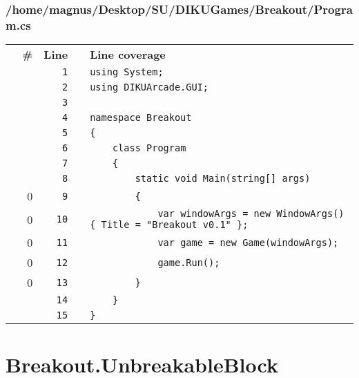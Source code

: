 \documentclass[a4paper,landscape,10pt]{article}
\begin{document}
\subsubsection{/home/magnus/Desktop/SU/DIKUGames/Breakout/Program.cs}
\begin{longtable}[l]{lrrll}
\textbf{} & \textbf{\#} & \textbf{Line} & \textbf{} & \textbf{Line coverage}\\
\cellcolor{gray} &  & \verb~1~ & & \verb~using System;~\\
\cellcolor{gray} &  & \verb~2~ & & \verb~using DIKUArcade.GUI;~\\
\cellcolor{gray} &  & \verb~3~ & & \verb~~\\
\cellcolor{gray} &  & \verb~4~ & & \verb~namespace Breakout~\\
\cellcolor{gray} &  & \verb~5~ & & \verb~{~\\
\cellcolor{gray} &  & \verb~6~ & & \verb~    class Program~\\
\cellcolor{gray} &  & \verb~7~ & & \verb~    {~\\
\cellcolor{gray} &  & \verb~8~ & & \verb~        static void Main(string[] args)~\\
\cellcolor{red} & 0 & \verb~9~ & & \verb~        {~\\
\cellcolor{red} & 0 & \verb~10~ & & \verb~            var windowArgs = new WindowArgs() { Title = "Breakout v0.1" };~\\
\cellcolor{red} & 0 & \verb~11~ & & \verb~            var game = new Game(windowArgs);~\\
\cellcolor{red} & 0 & \verb~12~ & & \verb~            game.Run();~\\
\cellcolor{red} & 0 & \verb~13~ & & \verb~        }~\\
\cellcolor{gray} &  & \verb~14~ & & \verb~    }~\\
\cellcolor{gray} &  & \verb~15~ & & \verb~}~\\
\end{longtable}
\newpage
\section{Breakout.UnbreakableBlock}
\end{document}
